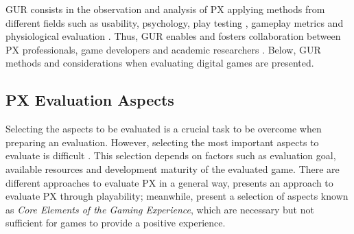 \ac{GUR} consists in the observation and analysis of \ac{PX} applying methods from different fields such as usability, psychology, play testing \autocite{Wiemeyer2016}, gameplay metrics \autocite{Drachen2013} and physiological evaluation \autocite{Nacke2015}. Thus, \ac{GUR} enables and fosters collaboration between \ac{PX} professionals, game developers and academic researchers \autocite{desurvire_methods_2013}. Below, \ac{GUR} methods and considerations when evaluating digital games are presented.


\subsection{\ac{PX} Evaluation Aspects}
\label{subsec:aspects}

Selecting the aspects to be evaluated is a crucial task to be overcome when preparing an evaluation. However, selecting the most important aspects to evaluate is difficult \autocite{Nacked}. This selection depends on factors such as evaluation goal, available resources and development maturity of the evaluated game. There are different approaches to evaluate \ac{PX} in a general way, \textcite{Sanchez2009} presents an approach to evaluate \ac{PX} through playability; meanwhile, \textcite{Calvillo-Gamez2015} present a selection of aspects known as \emph{Core Elements of the Gaming Experience}, which are necessary but not sufficient for games to provide a positive experience.

